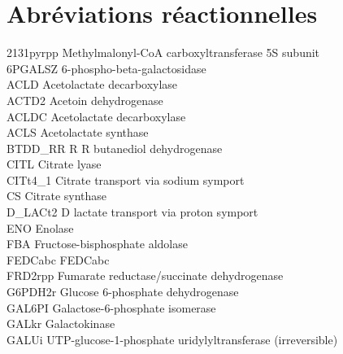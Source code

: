 \section*{Abréviations réactionnelles}
\label{abbreviation-reac}
\noindent
2131pyrpp \hspace{.5em} Methylmalonyl-CoA carboxyltransferase 5S subunit \\
6PGALSZ \hspace{.5em} 6-phospho-beta-galactosidase \\
ACLD \hspace{.5em} Acetolactate decarboxylase \\
ACTD2 \hspace{.5em} Acetoin dehydrogenase \\
ACLDC \hspace{.5em} Acetolactate decarboxylase \\
ACLS \hspace{.5em} Acetolactate synthase \\
BTDD\_RR \hspace{.5em} R R  butanediol dehydrogenase \\
CITL \hspace{.5em} Citrate lyase \\
CITt4\_1 \hspace{.5em} Citrate transport via sodium symport \\
CS \hspace{.5em} Citrate synthase \\
D\_LACt2 \hspace{.5em} D lactate transport via proton symport \\
ENO \hspace{.5em} Enolase \\
FBA \hspace{.5em} Fructose-bisphosphate aldolase \\
FEDCabc \hspace{.5em} FEDCabc \\
FRD2rpp \hspace{.5em} Fumarate reductase/succinate dehydrogenase \\
G6PDH2r \hspace{.5em} Glucose 6-phosphate dehydrogenase \\
GAL6PI \hspace{.5em} Galactose-6-phosphate isomerase \\
GALkr \hspace{.5em} Galactokinase \\
GALUi \hspace{.5em} UTP-glucose-1-phosphate uridylyltransferase (irreversible) \\
